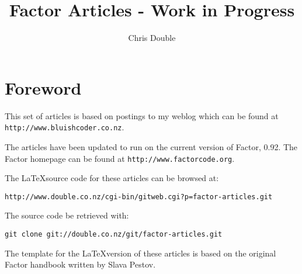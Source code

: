 \documentclass{book}
\begin{document}
\title{Factor Articles - Work in Progress}

\author{Chris Double}

\maketitle
\tableofcontents{}

\chapter*{Foreword}

This set of articles is based on postings to my weblog which can be found at \verb|http://www.bluishcoder.co.nz|.

The articles have been updated to run on the current version of Factor, 0.92. The Factor homepage can be found at \verb|http://www.factorcode.org|.

The \LaTeX source code for these articles can be browsed at:
\begin{verbatim}
http://www.double.co.nz/cgi-bin/gitweb.cgi?p=factor-articles.git
\end{verbatim}

The source code be retrieved with:
\begin{verbatim}
git clone git://double.co.nz/git/factor-articles.git
\end{verbatim}

The template for the \LaTeX version of these articles is based on the original Factor handbook written by Slava Pestov.




















\end{document}
